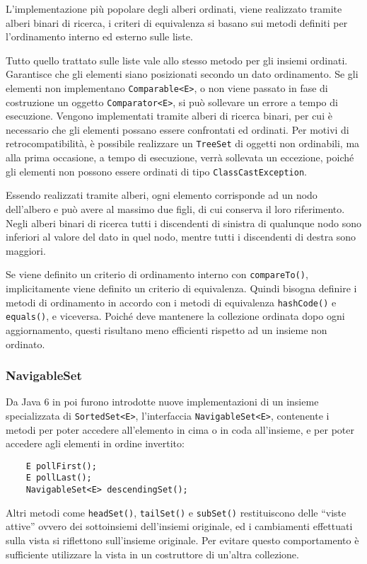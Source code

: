 \documentclass{article}
\numberwithin{equation}{subsection}
\begin{document}
L'implementazione più popolare degli alberi ordinati, viene realizzato tramite alberi binari di ricerca, i criteri di equivalenza si basano sui metodi definiti per l'ordinamento 
interno ed esterno sulle liste. 

Tutto quello trattato sulle liste vale allo stesso metodo per gli insiemi ordinati. 
Garantisce che gli elementi siano posizionati secondo un dato ordinamento. 
Se gli elementi non implementano \verb|Comparable<E>|, o non viene passato in fase di costruzione un oggetto \verb|Comparator<E>|, si può sollevare un errore a tempo di 
esecuzione. 
Vengono implementati tramite alberi di ricerca binari, per cui è necessario che gli elementi possano essere confrontati ed ordinati. Per motivi di retrocompatibilità, 
è possibile realizzare un \verb|TreeSet| di oggetti non ordinabili, ma alla prima occasione, a tempo di esecuzione, verrà sollevata un eccezione, poiché gli elementi non possono 
essere ordinati di tipo \verb|ClassCastException|. 

Essendo realizzati tramite alberi, ogni elemento corrisponde ad un nodo dell'albero e può avere al massimo due figli, di cui conserva il loro riferimento. Negli alberi binari di ricerca tutti 
i discendenti di sinistra di qualunque nodo sono inferiori al valore del dato in quel nodo, mentre tutti i discendenti di destra sono maggiori. 

Se viene definito un criterio di ordinamento interno con \verb|compareTo()|, implicitamente viene definito un criterio di equivalenza. Quindi bisogna definire i metodi di ordinamento in 
accordo con i metodi di equivalenza \verb|hashCode()| e \verb|equals()|, e viceversa.  
Poiché deve mantenere la collezione ordinata dopo ogni aggiornamento, questi risultano meno efficienti rispetto ad un insieme non ordinato. 

\subsubsection{NavigableSet}

Da Java 6 in poi furono introdotte nuove implementazioni di un insieme specializzata di \verb|SortedSet<E>|, l'interfaccia \verb|NavigableSet<E>|, contenente i metodi per poter 
accedere all'elemento in cima o in coda all'insieme, e per poter accedere agli elementi in ordine invertito:
\begin{verbatim}
    E pollFirst();
    E pollLast();
    NavigableSet<E> descendingSet();
\end{verbatim}
Altri metodi come \verb|headSet()|, \verb|tailSet()| e \verb|subSet()| restituiscono delle ``viste attive'' ovvero dei sottoinsiemi dell'insiemi originale, ed i cambiamenti 
effettuati sulla vista si riflettono sull'insieme originale. Per evitare questo comportamento è sufficiente utilizzare la vista in un costruttore di un'altra collezione.  
\end{document}
